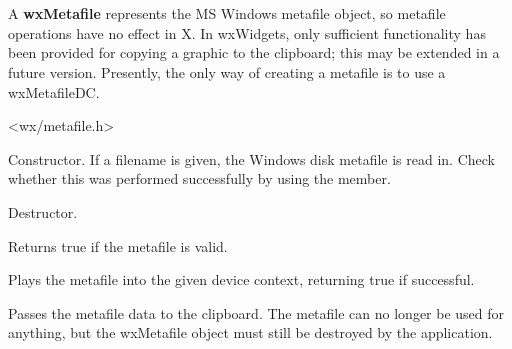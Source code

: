 \section{}\label{wxmetafile}

A {\bf wxMetafile} represents the MS Windows metafile object, so metafile
operations have no effect in X. In wxWidgets, only sufficient functionality
has been provided for copying a graphic to the clipboard; this may be extended
in a future version. Presently, the only way of creating a metafile
is to use a wxMetafileDC.




<wx/metafile.h>




\label{wxmetafilector}


Constructor. If a filename is given, the Windows disk metafile is
read in. Check whether this was performed successfully by
using the  member.

\label{wxmetafiledtor}


Destructor.

\label{wxmetafileok}


Returns true if the metafile is valid.

\label{wxmetafileplay}


Plays the metafile into the given device context, returning
true if successful.

\label{wxmetafilesetclipboard}


Passes the metafile data to the clipboard. The metafile can no longer be
used for anything, but the wxMetafile object must still be destroyed by
the application.

